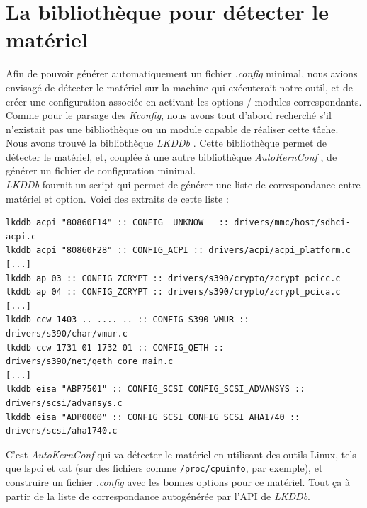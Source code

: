 ﻿\documentclass[17pts]{report}
\begin{document}
\section{La bibliothèque pour détecter le matériel}
\label{sec:La bibliothèque pour détecter le matériel}
Afin de pouvoir générer automatiquement un fichier \textit{.config} minimal,
nous avions envisagé de détecter le matériel sur la machine qui exécuterait
notre outil, et de créer une configuration associée en activant les options /
modules correspondants. Comme pour le parsage des \textit{Kconfig}, nous avons
tout d'abord recherché s'il n'existait pas une bibliothèque ou un module
capable de réaliser cette tâche. Nous avons trouvé la bibliothèque
\textit{LKDDb} \cite{Existant:lib:lkddb}. Cette bibliothèque permet de détecter
le matériel, et, couplée à une autre bibliothèque \textit{AutoKernConf}
\cite{Existant:lib:autoKernConf}, de générer un fichier de configuration
minimal. \\

\textit{LKDDb} fournit un script qui permet de générer une liste de
correspondance entre matériel et option. Voici des extraits de cette liste : \\

\begin{verbatim}
lkddb acpi "80860F14" :: CONFIG__UNKNOW__ :: drivers/mmc/host/sdhci-acpi.c
lkddb acpi "80860F28" :: CONFIG_ACPI :: drivers/acpi/acpi_platform.c
[...]
lkddb ap 03 :: CONFIG_ZCRYPT :: drivers/s390/crypto/zcrypt_pcicc.c
lkddb ap 04 :: CONFIG_ZCRYPT :: drivers/s390/crypto/zcrypt_pcica.c
[...]
lkddb ccw 1403 .. .... .. :: CONFIG_S390_VMUR :: drivers/s390/char/vmur.c
lkddb ccw 1731 01 1732 01 :: CONFIG_QETH :: drivers/s390/net/qeth_core_main.c
[...]
lkddb eisa "ABP7501" :: CONFIG_SCSI CONFIG_SCSI_ADVANSYS :: drivers/scsi/advansys.c
lkddb eisa "ADP0000" :: CONFIG_SCSI CONFIG_SCSI_AHA1740 :: drivers/scsi/aha1740.c
\end{verbatim}

C'est \textit{AutoKernConf} qui va détecter le matériel en utilisant des outils
Linux, tels que lspci et cat (sur des fichiers comme \verb|/proc/cpuinfo|, par
exemple), et construire un fichier \textit{.config} avec les bonnes options pour
ce matériel. Tout ça à partir de la liste de correspondance autogénérée par
l'API de \textit{LKDDb}. \\
\end{document}
